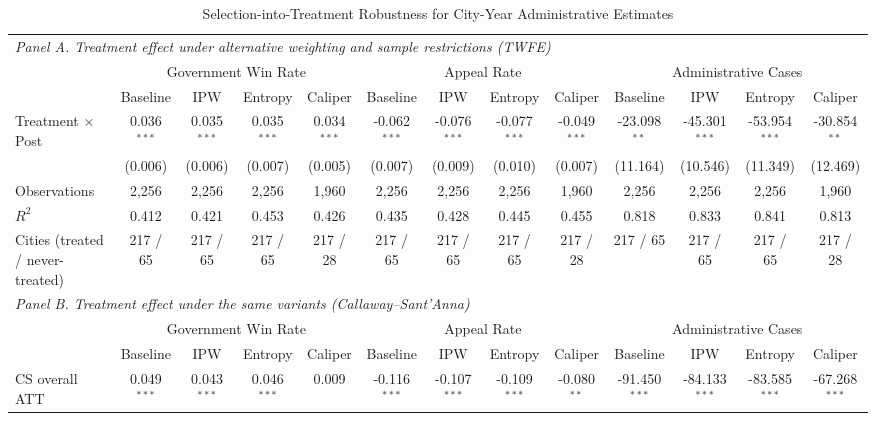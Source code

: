 \begin{table}[!htbp]
\setlength{\abovecaptionskip}{0pt}
\centering
\caption{Selection-into-Treatment Robustness for City-Year Administrative Estimates}
\label{tab:city_year_selection_robustness_appendix}
\begin{threeparttable}
\begin{tabular}{l*{12}{c}}
\toprule
\multicolumn{13}{l}{\textit{Panel A. Treatment effect under alternative weighting and sample restrictions (TWFE)}} \\
\addlinespace
 & \multicolumn{4}{c}{Government Win Rate} & \multicolumn{4}{c}{Appeal Rate} & \multicolumn{4}{c}{Administrative Cases} \\
\cmidrule(lr){2-5}\cmidrule(lr){6-9}\cmidrule(lr){10-13}
 & Baseline & IPW & Entropy & Caliper & Baseline & IPW & Entropy & Caliper & Baseline & IPW & Entropy & Caliper \\
\midrule
Treatment $\times$ Post & 0.036$^{***}$ & 0.035$^{***}$ & 0.035$^{***}$ & 0.034$^{***}$ & -0.062$^{***}$ & -0.076$^{***}$ & -0.077$^{***}$ & -0.049$^{***}$ & -23.098$^{**}$ & -45.301$^{***}$ & -53.954$^{***}$ & -30.854$^{**}$ \\
& (0.006) & (0.006) & (0.007) & (0.005) & (0.007) & (0.009) & (0.010) & (0.007) & (11.164) & (10.546) & (11.349) & (12.469) \\
\addlinespace
Observations & 2,256 & 2,256 & 2,256 & 1,960 & 2,256 & 2,256 & 2,256 & 1,960 & 2,256 & 2,256 & 2,256 & 1,960 \\
$R^2$ & 0.412 & 0.421 & 0.453 & 0.426 & 0.435 & 0.428 & 0.445 & 0.455 & 0.818 & 0.833 & 0.841 & 0.813 \\
Cities (treated / never-treated) & 217 / 65 & 217 / 65 & 217 / 65 & 217 / 28 & 217 / 65 & 217 / 65 & 217 / 65 & 217 / 28 & 217 / 65 & 217 / 65 & 217 / 65 & 217 / 28 \\
\midrule
\multicolumn{13}{l}{\textit{Panel B. Treatment effect under the same variants (Callaway--Sant'Anna)}} \\
\addlinespace
 & \multicolumn{4}{c}{Government Win Rate} & \multicolumn{4}{c}{Appeal Rate} & \multicolumn{4}{c}{Administrative Cases} \\
\cmidrule(lr){2-5}\cmidrule(lr){6-9}\cmidrule(lr){10-13}
 & Baseline & IPW & Entropy & Caliper & Baseline & IPW & Entropy & Caliper & Baseline & IPW & Entropy & Caliper \\
\midrule
CS overall ATT & 0.049$^{***}$ & 0.043$^{***}$ & 0.046$^{***}$ & 0.009 & -0.116$^{***}$ & -0.107$^{***}$ & -0.109$^{***}$ & -0.080$^{**}$ & -91.450$^{***}$ & -84.133$^{***}$ & -83.585$^{***}$ & -67.268$^{***}$ \\

\end{tabular}
\end{threeparttable}
\end{table}
